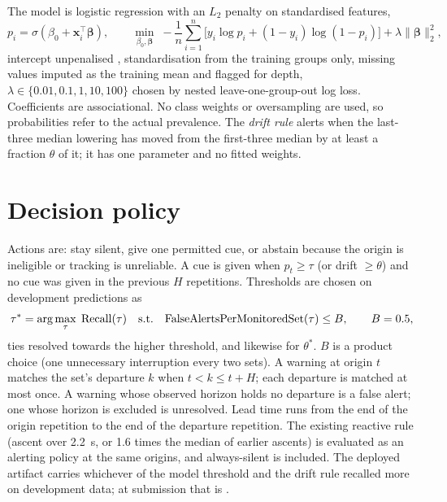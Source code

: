 \documentclass[11pt,a4paper]{article}
\begin{document}
The model is logistic regression with an $L_2$ penalty on standardised features,
\begin{equation}
p_i = \sigma(\beta_0 + \mathbf{x}_i^{\top}\boldsymbol\beta), \qquad
\min_{\beta_0,\boldsymbol\beta}\; -\frac{1}{n}\sum_{i=1}^{n}\big[y_i \log p_i + (1-y_i)\log(1-p_i)\big] + \lambda\lVert\boldsymbol\beta\rVert_2^2,
\end{equation}
intercept unpenalised \cite{hastie2009}, standardisation from the training groups only, missing values imputed as the training mean and flagged for depth, $\lambda \in \{0.01, 0.1, 1, 10, 100\}$ chosen by nested leave-one-group-out log loss. Coefficients are associational. No class weights or oversampling are used, so probabilities refer to the actual prevalence. The \emph{drift rule} alerts when the last-three median lowering has moved from the first-three median by at least a fraction $\theta$ of it; it has one parameter and no fitted weights.

\section{Decision policy}

Actions are: stay silent, give one permitted cue, or abstain because the origin is ineligible or tracking is unreliable. A cue is given when $p_t \ge \tau$ (or drift $\ge \theta$) and no cue was given in the previous $H$ repetitions. Thresholds are chosen on development predictions as
\begin{equation}
\tau^{*} = \arg\max_{\tau}\; \mathrm{Recall}(\tau) \quad \text{s.t.} \quad \mathrm{FalseAlertsPerMonitoredSet}(\tau) \le B, \qquad B = 0.5,
\end{equation}
ties resolved towards the higher threshold, and likewise for $\theta^{*}$. $B$ is a product choice (one unnecessary interruption every two sets). A warning at origin $t$ matches the set's departure $k$ when $t < k \le t + H$; each departure is matched at most once. A warning whose observed horizon holds no departure is a false alert; one whose horizon is excluded is unresolved. Lead time runs from the end of the origin repetition to the end of the departure repetition. The existing reactive rule (ascent over 2.2~s, or 1.6 times the median of earlier ascents) is evaluated as an alerting policy at the same origins, and always-silent is included. The deployed artifact carries whichever of the model threshold and the drift rule recalled more on development data; at submission that is \DeployedPolicy.
\end{document}
